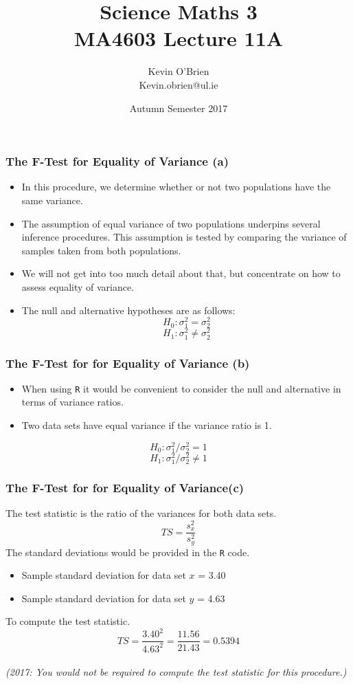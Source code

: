 \documentclass[a4]{beamer}
\title[MA4603]{Science Maths 3 \\ {\normalsize MA4603 Lecture 11A}}
\author[Kevin O'Brien]{Kevin O'Brien \\ {\scriptsize Kevin.obrien@ul.ie}}
\date{Autumn Semester 2017}
\institute[Maths \& Stats]{Dept. of Mathematics \& Statistics, \\ University \textit{of} Limerick}
\begin{document}

\begin{frame}

\frametitle{The F-Test for Equality of Variance (a)}
\begin{itemize}
\item In this procedure, we determine whether or not two populations have the same variance.
\item The assumption of equal variance of two populations underpins several inference procedures. This assumption is tested by comparing the variance of samples taken from both populations.
\item We will not get into too much detail about that, but concentrate on how to assess equality of variance.
\item The null and alternative hypotheses are as follows:
\[ H_0: \sigma^2_1 = \sigma^2_2 \]
\[ H_1: \sigma^2_1 \neq \sigma^2_2 \]
\end{itemize}

\end{frame}
\begin{frame}
\frametitle{The F-Test for for Equality of Variance (b)}
\begin{itemize}
\item When using \texttt{R} it would be convenient to consider the null and alternative in terms of variance ratios.
\item Two data sets have equal variance if the variance ratio is 1.
\end{itemize}

\[ H_0: \sigma^2_1 / \sigma^2_2 = 1 \]
\[ H_1: \sigma^2_1 / \sigma^2_2 \neq 1 \]
\end{frame}
\begin{frame}[fragile]
\frametitle{The F-Test for for Equality of Variance(c)}

The test statistic is the ratio of the variances for both data sets.
\[ TS = \frac{s^2_x}{s^2_y} \]
The standard deviations would be provided in the \texttt{R} code. \begin{itemize}
\item Sample standard deviation for data set $x$ = 3.40
\item Sample standard deviation for data set $y$ = 4.63
\end{itemize}
To compute the test statistic.
\[ TS = \frac{3.40^2}{4.63^2} = \frac{11.56}{21.43} = 0.5394 \]\\
\textit{(2017: You would not be required to compute the test statistic for this procedure.)}
\end{frame}
\end{document}
